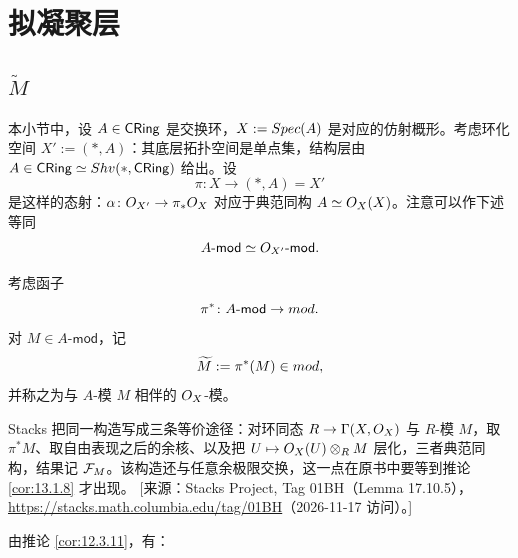 
\section{拟凝聚层}\label{sec:13}

\subsection{$\widetilde{M}$}\label{sec:13.1}

本小节中，设 $A\in\mathsf{CRing}$ 是交换环，$X:=Spec(A)$ 是对应的仿射概形。考虑环化空间 $X':=(*,A)$：其底层拓扑空间是单点集，结构层由 $A\in\mathsf{CRing}\simeq Shv(*,\mathsf{CRing})$ 给出。设
\[
\pi\colon X\to(*,A)=X'
\]
是这样的态射：$\alpha\colon O_{X'}\to\pi_*O_X$ 对应于典范同构 $A\simeq O_X(X)$。注意可以作下述等同
\[
A\text{-}\mathsf{mod}\simeq O_{X'}\text{-}\mathsf{mod}.
\]

\begin{definition}\label{def:13.1.1}
考虑函子
\[
\pi^*\colon A\text{-}\mathsf{mod}\to mod.
\]
对 $M\in A\text{-}\mathsf{mod}$，记
\[
\widetilde{M}:=\pi^*(M)\in mod,
\]
并称之为与 $A$-模 $M$ 相伴的 $O_X$-模。
\end{definition}

\begin{yizhu}
Stacks 把同一构造写成三条等价途径：对环同态 $R\to\Gamma(X,O_X)$ 与 $R$-模 $M$，取 $\pi^*M$、取自由表现之后的余核、以及把 $U\mapsto O_X(U)\otimes_RM$ 层化，三者典范同构，结果记 $\mathcal{F}_M$。该构造还与任意余极限交换，这一点在原书中要等到推论 \ref{cor:13.1.8} 才出现。
[来源：Stacks Project, Tag 01BH（Lemma 17.10.5），\url{https://stacks.math.columbia.edu/tag/01BH}（2026-11-17 访问）。]
\end{yizhu}

由推论 \ref{cor:12.3.11}，有：

